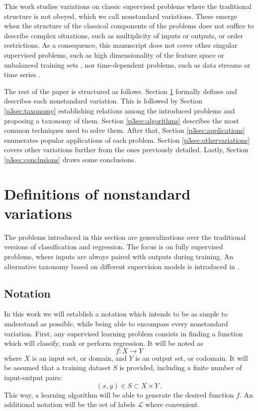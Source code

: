 This work studies variations on classic supervised problems where the traditional structure is not obeyed, which we call nonstandard variations. These emerge when the structure of the classical components of the problems does not suffice to describe complex situations, such as multiplicity of inputs or outputs, or order restrictions. As a consequence, this manuscript does not cover other singular supervised problems, such as high dimensionality of the feature space  or unbalanced training sets , nor time-dependent problems, such as data streams  or time series .

The rest of the paper is structured as follows. Section \ref{p3sec:definitions} formally defines and describes each nonstandard variation. This is followed by Section \ref{p3sec:taxonomy} establishing relations among the introduced problems and proposing a taxonomy of them. Section \ref{p3sec:algorithms} describes the most common techniques used to solve them. After that, Section \ref{p3sec:applications} enumerates popular applications of each problem. {Section \ref{p3sec:othervariations} covers other variations further from the ones previously detailed.} Lastly, Section \ref{p3sec:conclusions} draws some conclusions.

\section{Definitions of nonstandard variations}
\label{p3sec:definitions}

The problems introduced in this section are generalizations over the traditional versions of classification and regression. The focus is on fully supervised problems, where inputs are always paired with outputs during training. An alternative taxonomy based on different supervision models is introduced in .


\subsection{Notation}
\label{p3sec:notation}

In this work we will establish a notation which intends to be as simple to understand as possible, while being able to encompass every nonstandard variation. First, any supervised learning problem consists in finding a function which will classify, rank or perform regression. It will be noted as
\begin{equation}
  f: X\rightarrow Y
\end{equation}
where $X$ is an input set, or domain, and $Y$ is an output set, or codomain. It will be assumed that a training dataset $S$ is provided, including a finite number of input-output pairs:
\begin{equation}
  (x, y)\in S\subset X\times Y~.
\end{equation}
This way, a learning algorithm will be able to generate the desired function $f$. An additional notation will be the set of labels $\mathcal L$ where convenient. 

